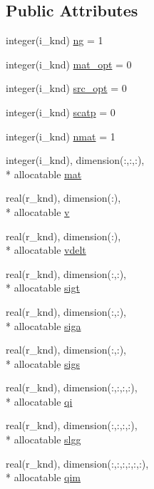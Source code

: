 \subsection*{Public Attributes}
\begin{DoxyCompactItemize}
\item 
integer(i\-\_\-knd) \hyperlink{classdata__module_a6ea7c9f76a6293c4f8b39b1782564561}{ng} = 1
\item 
integer(i\-\_\-knd) \hyperlink{classdata__module_a191b122ec7d6da5c691c45d89d65694f}{mat\-\_\-opt} = 0
\item 
integer(i\-\_\-knd) \hyperlink{classdata__module_aa630a65ce606a2869f55b214eeb6d9ec}{src\-\_\-opt} = 0
\item 
integer(i\-\_\-knd) \hyperlink{classdata__module_a7ac9af7f12e8f03d3ba40fa78904d5a1}{scatp} = 0
\item 
integer(i\-\_\-knd) \hyperlink{classdata__module_ad6de7dfbc5089cdc8cdfe59d6232f7d2}{nmat} = 1
\item 
integer(i\-\_\-knd), dimension(\-:,\-:,\-:), \\*
allocatable \hyperlink{classdata__module_aee30087acd108308e1a8e8bdd3f14dcf}{mat}
\item 
real(r\-\_\-knd), dimension(\-:), \\*
allocatable \hyperlink{classdata__module_a61d334d68509b4d5fac687707ac83241}{v}
\item 
real(r\-\_\-knd), dimension(\-:), \\*
allocatable \hyperlink{classdata__module_a8df0533fb95046e281a489f1c5dc9030}{vdelt}
\item 
real(r\-\_\-knd), dimension(\-:,\-:), \\*
allocatable \hyperlink{classdata__module_a3455329887f17be6b34eaa771348a3bf}{sigt}
\item 
real(r\-\_\-knd), dimension(\-:,\-:), \\*
allocatable \hyperlink{classdata__module_a536d3b44d8d6b245eabd2672f5cc8d65}{siga}
\item 
real(r\-\_\-knd), dimension(\-:,\-:), \\*
allocatable \hyperlink{classdata__module_a198158103501dbae827a7ccee2a1f91f}{sigs}
\item 
real(r\-\_\-knd), dimension(\-:,\-:,\-:,\-:), \\*
allocatable \hyperlink{classdata__module_a6d90b19307bcaef3132e6854534ba68f}{qi}
\item 
real(r\-\_\-knd), dimension(\-:,\-:,\-:,\-:), \\*
allocatable \hyperlink{classdata__module_a28dc2858f4b2054a06645430e7292d2a}{slgg}
\item 
real(r\-\_\-knd), dimension(\-:,\-:,\-:,\-:,\-:,\-:), \\*
allocatable \hyperlink{classdata__module_ab410d844881c0109e63b2e26e3dbbd37}{qim}
\end{DoxyCompactItemize}


